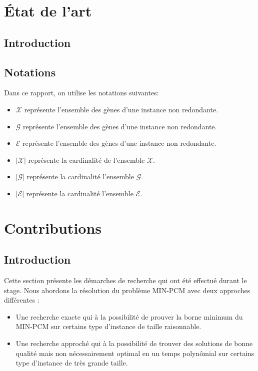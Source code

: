 \documentclass[a4paper,12pt]{article}
\begin{document}
\newpage
\tableofcontents
\newpage

\section{État de l'art}
\subsection{Introduction}
\subsection{Notations}
Dans ce rapport, on utilise les notations suivantes:
\begin{itemize}
\item $\mathcal{X}$ représente l'ensemble des gènes d'une instance non redondante.
\item $\mathcal{G}$ représente l'ensemble des gènes d'une instance non redondante.
\item $\mathcal{E}$ représente l'ensemble des gènes d'une instance non redondante.
\item $|\mathcal{X}|$ représente la cardinalité de l'ensemble $\mathcal{X}$.
\item $|\mathcal{G}|$ représente la cardinalité l'ensemble $\mathcal{G}$.
\item $|\mathcal{E}|$ représente la cardinalité l'ensemble $\mathcal{E}$.
\end{itemize}

\section{Contributions}

\subsection{Introduction} 
Cette section présente les démarches de recherche qui ont été effectué durant le stage. Nous abordons la résolution du problème MIN-PCM avec deux approches différentes :
\begin{itemize}
\item Une recherche exacte qui à la possibilité de prouver la borne minimum du MIN-PCM sur certains type d'instance de taille raisonnable.
\item Une recherche approché qui à la possibilité de trouver des solutions de bonne qualité mais non nécessairement optimal en un temps polynômial sur certains type d'instance de très grande taille.\\
\end{itemize} 
\end{document}
